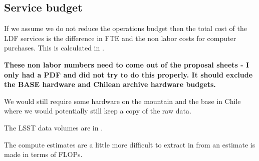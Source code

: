 \subsection{Service budget}

If we assume we do not reduce the operations budget then the total cost of the \gls{LDF} services is
the difference in \gls{FTE} and the non labor costs for computer purchases.
This is calculated in  .



\textbf{ These non labor numbers need to come out of the proposal sheets - I only had a \gls{PDF} and did not try to do this properly. It should exclude the BASE hardware and Chilean archive hardware budgets.}


We would still require some hardware on the mountain and the base in Chile where we would potentially still keep a copy of the raw data.


The  LSST data volumes are in  .





The compute estimates are a little more difficult to extract in  from 
an estimate is made in terms of FLOPs.


